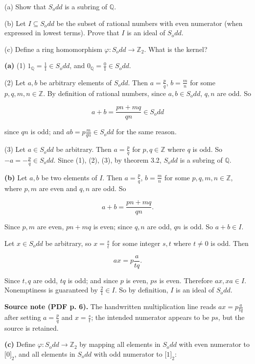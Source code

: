 (a) Show that \(S_{o}dd\) is a subring of \(\mathbb{Q}\).

(b) Let \(I \subseteq S_{o}dd\) be the subset of rational numbers with even numerator (when expressed in lowest terms). Prove that \(I\) is an ideal of \(S_{o}dd\).

(c) Define a ring homomorphism \(\varphi:S_{o}dd\rightarrow\mathbb{Z}_{2}\). What is the kernel?

\textbf{(a)} (1) \(1_{\mathbb{Q}} = \frac{1}{1} \in S_{o}dd\), and \(0_{\mathbb{Q}} = \frac{0}{1} \in S_{o}dd\).

(2) Let \(a,b\) be arbitrary elements of \(S_{o}dd\). Then \(a = \frac{p}{q}\), \(b = \frac{m}{n}\) for some \(p,q,m,n \in \mathbb{Z}\). By definition of rational numbers, since \(a,b \in S_{o}dd\), \(q,n\) are odd. So

\[a + b = \frac{pn + mq}{qn} \in S_{o}dd\]

since \(qn\) is odd; and \(ab = p\frac{m}{qn} \in S_{o}dd\) for the same reason.

(3) Let \(a \in S_{o}dd\) be arbitrary. Then \(a = \frac{p}{q}\) for \(p,q \in \mathbb{Z}\) where \(q\) is odd. So \(- a = - \frac{p}{q} \in S_{o}dd\). Since (1), (2), (3), by theorem 3.2, \(S_{o}dd\) is a subring of \(\mathbb{Q}\).

\textbf{(b)} Let \(a,b\) be two elements of \(I\). Then \(a = \frac{p}{q}\), \(b = \frac{m}{n}\) for some \(p,q,m,n \in \mathbb{Z}\), where \(p,m\) are even and \(q,n\) are odd. So

\[a + b = \frac{pn + mq}{qn}.\]

Since \(p,m\) are even, \(pn + mq\) is even; since \(q,n\) are odd, \(qn\) is odd. So \(a + b \in I\).

Let \(x \in S_{o}dd\) be arbitrary, so \(x = \frac{s}{t}\) for some integer \(s,t\) where \(t \neq 0\) is odd. Then

\[ax = p\frac{a}{tq}.\]

Since \(t,q\) are odd, \(tq\) is odd; and since \(p\) is even, \(ps\) is even. Therefore \(ax,xa \in I\). Nonemptiness is guaranteed by \(\frac{2}{1} \in I\). So by definition, \(I\) is an ideal of \(S_{o}dd\).

{\textbf{Source note (PDF p. 6).} The handwritten multiplication line reads \(ax = p\frac{a}{tq}\) after setting \(a = \frac{p}{q}\) and \(x = \frac{s}{t}\); the intended numerator appears to be \(ps\), but the source is retained.}

\textbf{(c)} Define \(\varphi:S_{o}dd\rightarrow\mathbb{Z}_{2}\) by mapping all elements in \(S_{o}dd\) with even numerator to \(\lbrack 0\rbrack_{2}\), and all elements in \(S_{o}dd\) with odd numerator to \(\lbrack 1\rbrack_{2}\):

